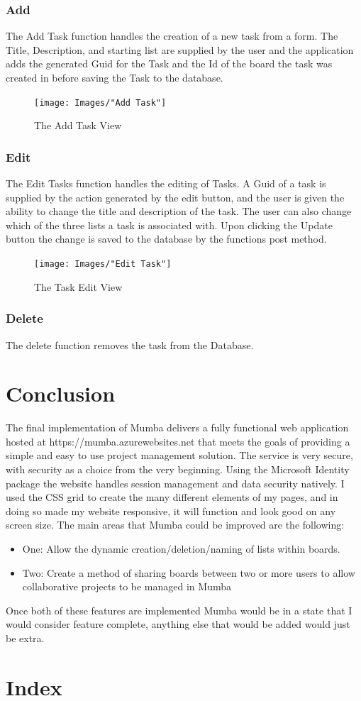 \documentclass[letterpaper]{article}
\begin{document}
\subsubsection{Add}
The Add Task function handles the creation of a new task from a form. The Title, Description, and starting list are supplied by the user and the application adds the generated Guid for the Task and the Id of the board the task was created in before saving the Task to the database.
\begin{figure}[H]
  \centering
  \caption{The Add Task View}
  \texttt{[image: Images/"Add Task"]}
\end{figure}

\subsubsection{Edit}

The Edit Tasks function handles the editing of Tasks. A Guid of a task is supplied by the action generated by the edit button, and the user is given the ability to change the title and description of the task. The user can also change which of the three lists a task is associated with. Upon clicking the Update button the change is saved to the database by the functions post method.

\begin{figure}[H]
  \centering
  \caption{The Task Edit View}
  \texttt{[image: Images/"Edit Task"]}
\end{figure}


\subsubsection{Delete}
The delete function removes the task from the Database.

\pagebreak
\section{Conclusion}
The final implementation of Mumba delivers a fully functional web application hosted at https://mumba.azurewebsites.net that meets the goals of providing a simple and easy to use project management solution. The service is very secure, with security as a choice from the very beginning. Using the Microsoft Identity package the website handles session management and data security natively. I used the CSS grid to create the many different elements of my pages, and in doing so made my website responsive, it will function and look good on any screen size. The main areas that Mumba could be improved are the following:
\begin{itemize}
  \item One: Allow the dynamic creation/deletion/naming of lists within boards.
  \item Two: Create a method of sharing boards between two or more users to allow collaborative projects to be managed in Mumba
\end{itemize}
Once both of these features are implemented Mumba would be in a state that I would consider feature complete, anything else that would be added would just be extra.
\pagebreak
\section{Index}
\listoffigures
\end{document}
